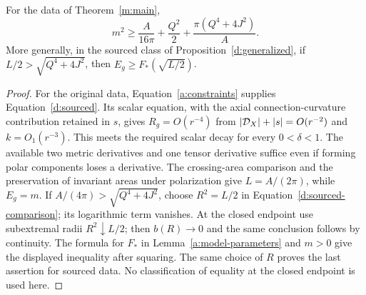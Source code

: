 \begin{corollary}\label{d:numerical}
For the data of Theorem~\ref{m:main},
\[
 m^2\ge\frac{A}{16\pi}+\frac{Q^2}{2}
              +\frac{\pi(Q^4+4J^2)}{A}.
\]
More generally, in the sourced class of
Proposition~\ref{d:generalized}, if $L/2>\sqrt{Q^4+4J^2}$, then
$E_g\ge F_*(\sqrt{L/2})$.
\end{corollary}
\begin{proof}
For the original data, Equation~\eqref{a:constraints} supplies
Equation~\eqref{d:sourced}.  Its scalar equation, with the axial
connection-curvature contribution retained in $s$, gives
$R_g=O(r^{-4})$ from $|\mathcal D_X|+|s|=O(r^{-2})$ and
$k=O_1(r^{-3})$.  This meets the required scalar decay for every
$0<\delta<1$.  The available two metric derivatives and one tensor
derivative suffice even if forming polar components loses a
derivative.  The crossing-area comparison and
the preservation of invariant areas under polarization give
$L=A/(2\pi)$, while $E_g=m$.  If
$A/(4\pi)>\sqrt{Q^4+4J^2}$, choose $R^2=L/2$ in
Equation~\eqref{d:sourced-comparison}; its logarithmic term vanishes.
At the closed endpoint use subextremal radii $R^2\downarrow L/2$;
then $b(R)\to0$ and the same conclusion follows by continuity.  The
formula for $F_*$ in Lemma~\ref{a:model-parameters} and $m>0$ give the
displayed inequality after squaring.  The same choice of $R$ proves
the last assertion for sourced data.  No classification of equality
at the closed endpoint is used here.
\end{proof}
